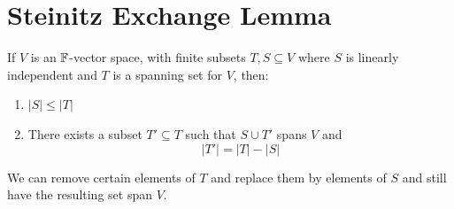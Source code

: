 \documentclass[../main.tex]{subfiles}
\begin{document}
\section{Steinitz Exchange Lemma}
\begin{theorem}
  If $V$ is an $\mathbb{F}$-vector space, with finite subsets $T, S \subseteq V$ where $S$ is linearly independent and $T$ is a spanning set for $V$, then: \label{steinitz}
  \begin{enumerate}
    \item $|S| \leq |T|$
    \item There exists a subset $T' \subseteq T$ such that $S \cup T'$ spans $V$ and
      \[
        |T'| = |T| - |S|
      \]
  \end{enumerate}
\end{theorem}
\begin{remark}[Intuition]
  We can remove certain elements of $T$ and replace them by elements of $S$ and still have the resulting set span $V$.
\end{remark}
\end{document}
